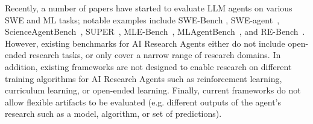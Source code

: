 \documentclass[]{fairmeta}
\newcommand{\mlgym}{\fontfamily{lmr}\selectfont\mdseries\textsc{MLGym}\xspace}
\begin{document}
Recently, a number of papers have started to evaluate LLM agents on various SWE and ML tasks; notable examples include SWE-Bench \citep{jimenez2023swe}, SWE-agent~\citep{yangSWEagentAgentComputerInterfaces2024}, ScienceAgentBench~\citep{chenScienceAgentBenchRigorousAssessment2024}, SUPER~\citep{boginSUPEREvaluatingAgents2024}, MLE-Bench~\citep{chanMLEbenchEvaluatingMachine2024}, MLAgentBench~\citep{huangMLAgentBenchEvaluatingLanguage2024}, and RE-Bench~\citep{rebench-metr}.
%
However, existing benchmarks for AI Research Agents either do not include open-ended research tasks, or only cover a narrow range of research domains. In addition, existing frameworks are not designed to enable research on different training algorithms for AI Research Agents such as reinforcement learning, curriculum learning, or open-ended learning. Finally, current frameworks do not allow flexible artifacts to be evaluated (e.g. different outputs of the agent's research such as a model, algorithm, or set of predictions). 

\end{document}
